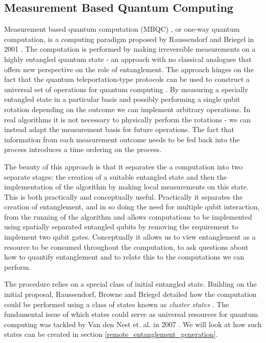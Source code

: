 \subsection{Measurement Based Quantum Computing}

Measurement based quantum computation (MBQC) \cite{mbqc_intro}, or one-way quantum computation, is a computing paradigm proposed by Raussendorf and Briegel in 2001 \cite{one_way_qc}.
The computation is performed by making irreversible measurements on a highly entangled quantum state - an approach with no classical analogues that offers new perspective on the role of entanglement.
The approach hinges on the fact that the quantum teleportation-type protocols can be used to construct a universal set of operations for quantum computing \cite{teleportation_universal}. By measuring a specially entangled state in a particular basis and possibly performing a single qubit rotation depending on the outcome we can implement arbitrary operations. In real algorithms it is not necessary to physically perform the rotations - we can instead adapt the measurement basis for future operations. The fact that information from each measurement outcome needs to be fed back into the process introduces a time ordering on the process. 

The beauty of this approach is that it separates the a computation into two separate stages: the creation of a suitable entangled state and then the implementation of the algorithm by making local measurements on this state. This is both practically and conceptually useful. Practically it separates the creation of entanglement, and in so doing the need for multiple qubit interaction, from the running of the algorithm and allows computations to be implemented using spatially separated entangled qubits by removing the requirement to implement two qubit gates. Conceptually it allows us to view entanglement as a resource to be consumed throughout the computation, to ask questions about how to quantify entanglement and to relate this to the computations we can perform.

The procedure relies on a special class of initial entangled state. Building on the initial proposal, Raussendorf, Browne and Briegel detailed how the computation could be performed using a class of states known as \textit{cluster states} \cite{mbqc_cluster_03}. The fundamental issue of which states could serve as universal resources for quantum computing was tackled by Van den Nest et. al. in 2007 \cite{which_states_universal_resources}. We will look at how such states can be created in section \ref{remote_entanglement_generation}.

